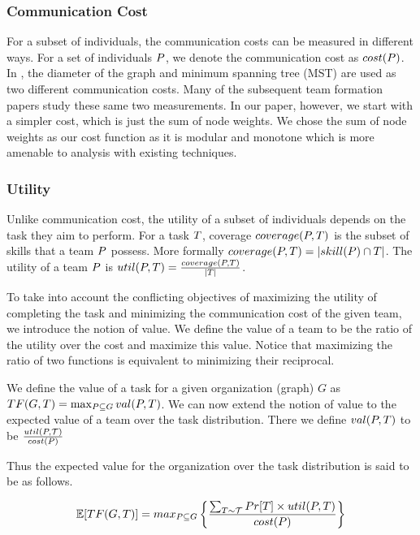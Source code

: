 \subsubsection{Communication Cost}
For a subset of individuals, the communication costs can be measured in different ways. 
For a set of individuals $P$, we denote the communication cost as $cost(P)$. 
In \cite{lappas2009finding}, the diameter of the graph and minimum spanning tree (MST) are used as two different communication costs.
Many of the subsequent team formation papers study these same two measurements.
In our paper, however, we start with a simpler cost, which is just the sum of node weights. We chose the sum of node weights as our cost function as it is modular and monotone which is more amenable to analysis with existing techniques. 

\subsubsection{Utility}
Unlike communication cost, the utility of a subset of individuals depends on the task they aim to perform. 
For a task $T$, coverage $coverage(P,T)$ is the subset of skills that a team $P$ possess.
More formally $coverage(P,T) = |skill(P) \cap T|$.
The utility of a team $ P $ is ${util}(P,T) = \frac{coverage(P, T)}{|T|}$.

To take into account the conflicting objectives of maximizing the utility of completing the task and minimizing the communication cost of the given team, we introduce the notion of value. We define the value of a team to be the ratio of the utility over the cost and maximize this value. Notice that maximizing the ratio of two functions is equivalent to minimizing their reciprocal.  

We define the value of a task for a given organization (graph) $G$ as $TF(G,T) = \max_{P \subseteq G}{val(P,T)}$. We can now extend the notion of value to the expected value of a team over the task distribution. There we define $val(P,T)$ to be $\frac{{util}(P,\mathcal{T})}{cost(P)} $

Thus the expected value for the organization over the task distribution is said to be as follows.

$$\mathbb{E}[TF(G,T)] = max_{P \subseteq G} \left\{ \frac{\sum_{T \sim \mathcal{T} } Pr[T] \times {util}(P, T)} {cost(P)} \right\} $$ \\

